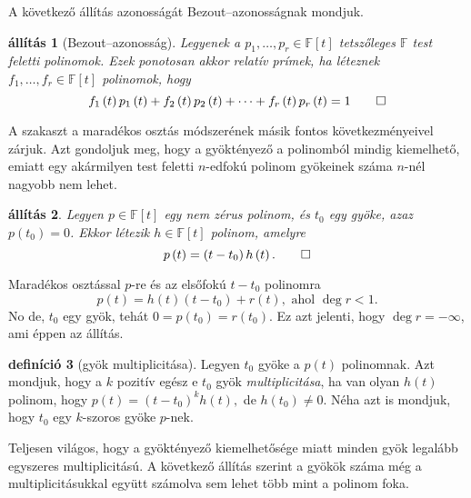 \documentclass[9pt,showtrims]{memoir}
\makeatletter
\renewenvironment{proof}[1][\proofname]
    {\par\pushQED{\qed}%
    \normalfont \topsep6\p@\@plus6\p@\relax
    \trivlist
    \item[\hskip\labelsep
        \itshape
    #1\@addpunct{:}]\ignorespaces}
    {\popQED\endtrivlist\@endpefalse}
\theoremstyle{plain}
\newtheorem{proposition}{állítás}[chapter]
\theoremstyle{remark}
\theoremstyle{definition}
\newtheorem{definition}[proposition]{definíció}
\renewcommand{\mathbf}{\mathbb}
\makeatother
\begin{document}
A következő állítás azonosságát Bezout--azonosságnak mondjuk.
\begin{proposition}[Bezout--azonosság]
    Legyenek a $p_1,\dots,p_r\in\mathbb{F}\left[ t \right]$ tetszőleges $\mathbb{F}$ test feletti polinomok.
    Ezek ponotosan akkor relatív prímek, 
    ha léteznek $f_1,\dots,f_r\in\mathbb{F}\left[ t \right]$ polinomok, hogy
    \[
        f_1\left( t \right)p_1\left( t \right)+f_2\left( t \right)p_2\left( t \right)+\dots+f_r\left( t \right)p_r\left( t \right)=1\qedhere
    \]
\end{proposition}

A szakaszt a maradékos osztás módszerének másik fontos következményeivel zárjuk.
Azt gondoljuk meg, 
hogy a gyöktényező a polinomból mindig kiemelhető, 
emiatt egy akármilyen test feletti $n$-edfokú polinom gyökeinek száma $n$-nél nagyobb nem lehet.
\begin{proposition}
    Legyen $p\in\mathbf{F}\left[ t \right]$ egy nem zérus polinom,
    és $t_0$ egy gyöke, azaz $p\left( t_0 \right)=0$.
    Ekkor létezik $h\in\mathbf{F}\left[ t \right]$ polinom,
    amelyre
    \[
        p\left( t \right)=\left( t-t_0 \right)h\left( t \right).\qedhere
    \]
\end{proposition}
\begin{proof}
    Maradékos osztással $p$-re és az elsőfokú $t-t_0$ polinomra
    \[
        p\left( t \right)=h\left( t \right)\left( t-t_0 \right)+r\left( t \right),
        \text{ ahol }
        \deg r<1.
    \]
    No de, $t_0$ egy gyök, tehát $0=p\left( t_0 \right)=r\left( t_0 \right)$. 
    Ez azt jelenti, hogy $\deg r=-\infty$, ami éppen az állítás.
\end{proof}
\begin{definition}[gyök multiplicitása]
        Legyen $t_0$ gyöke a $p\left( t \right)$ polinomnak.
        Azt mondjuk, hogy a $k$ pozitív egész e $t_0$ gyök \emph{multiplicitása},
        ha van olyan $h\left( t \right)$ polinom, hogy 
        \begin{math}
            p\left( t \right)=\left( t-t_0 \right)^kh\left( t \right),
        \end{math}
        de $h\left( t_0 \right)\neq 0$.
        Néha azt is mondjuk, hogy $t_0$ egy $k$-szoros gyöke $p$-nek.
\end{definition}
Teljesen világos, hogy a gyöktényező kiemelhetősége miatt minden gyök legalább egyszeres multiplicitású.
A következő állítás szerint 
a gyökök száma még a multiplicitásukkal együtt számolva sem lehet több mint a polinom foka.
\end{document}
